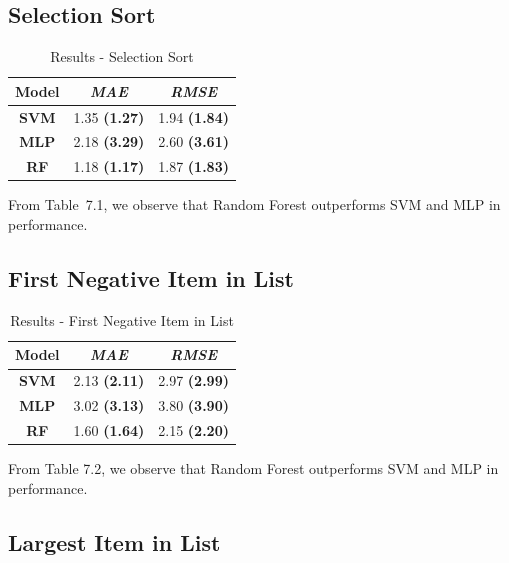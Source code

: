 \subsection{Selection Sort}

\begin{table}[h]
\centering
\caption{Results - Selection Sort}
\begin{tabular}{|c|c|c|}
\hline
\textbf{Model} & \textit{\textbf{MAE}} & \textit{\textbf{RMSE}} \\ \hline
\textbf{SVM}   & 1.35 \textbf{(1.27)}           & 1.94 \textbf{(1.84)}            \\ \hline
\textbf{MLP}   & 2.18 \textbf{(3.29)}           & 2.60 \textbf{(3.61)}             \\ \hline
\textbf{RF}    & 1.18 \textbf{(1.17)}           & 1.87 \textbf{(1.83)}            \\ \hline
\end{tabular}

\label{tab:selsort}
\end{table}

From Table~7.1, we observe that Random Forest outperforms SVM and MLP in performance. 


\subsection{First Negative Item in List}

\begin{table}[h]
\centering
\caption{Results - First Negative Item in List}
\begin{tabular}{|c|c|c|}
\hline
\textbf{Model} & \textit{\textbf{MAE}} & \textit{\textbf{RMSE}} \\ \hline
\textbf{SVM}   & 2.13 \textbf{(2.11)}           & 2.97 \textbf{(2.99)}            \\ \hline
\textbf{MLP}   & 3.02 \textbf{(3.13)}           & 3.80 \textbf{(3.90)}            \\ \hline
\textbf{RF}    & 1.60 \textbf{(1.64)}           & 2.15 \textbf{(2.20)}            \\ \hline
\end{tabular}

\label{tab:first-neg}
\end{table}

From Table 7.2, we observe that Random Forest outperforms SVM and MLP in performance. 


\subsection{Largest Item in List}

